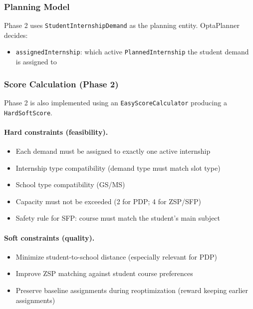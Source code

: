 \documentclass[12pt,a4paper]{report}
\begin{document}
\subsubsection*{Planning Model}

Phase 2 uses \texttt{StudentInternshipDemand} as the planning entity. OptaPlanner decides:

\begin{itemize}
    \item \texttt{assignedInternship}: which active \texttt{PlannedInternship} the student demand is assigned to
\end{itemize}

\subsubsection*{Score Calculation (Phase 2)}

Phase 2 is also implemented using an \texttt{EasyScoreCalculator} producing a \texttt{HardSoftScore}.

\paragraph{Hard constraints (feasibility).}
\begin{itemize}
    \item Each demand must be assigned to exactly one active internship
    \item Internship type compatibility (demand type must match slot type)
    \item School type compatibility (GS/MS)
    \item Capacity must not be exceeded (2 for PDP; 4 for ZSP/SFP)
    \item Safety rule for SFP: course must match the student's main subject
\end{itemize}

\paragraph{Soft constraints (quality).}
\begin{itemize}
    \item Minimize student-to-school distance (especially relevant for PDP)
    \item Improve ZSP matching against student course preferences
    \item Preserve baseline assignments during reoptimization (reward keeping earlier assignments)
\end{itemize}
\end{document}
